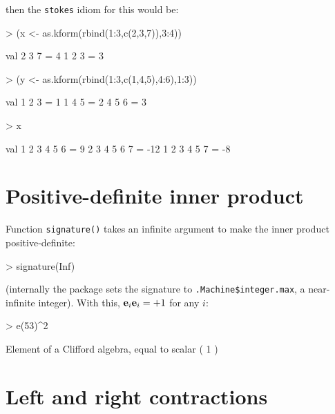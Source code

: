\documentclass{article}
\begin{document}
then the {\tt stokes} idiom for this would be:

\begin{Schunk}
\begin{Sinput}
> (x <- as.kform(rbind(1:3,c(2,3,7)),3:4))
\end{Sinput}
\begin{Soutput}
           val
 2 3 7  =    4
 1 2 3  =    3
\end{Soutput}
\begin{Sinput}
> (y <- as.kform(rbind(1:3,c(1,4,5),4:6),1:3))
\end{Sinput}
\begin{Soutput}
           val
 1 2 3  =    1
 1 4 5  =    2
 4 5 6  =    3
\end{Soutput}
\begin{Sinput}
> x %
\end{Sinput}
\begin{Soutput}
                 val
 1 2 3 4 5 6  =    9
 2 3 4 5 6 7  =  -12
 1 2 3 4 5 7  =   -8
\end{Soutput}
\end{Schunk}


\section{Positive-definite inner product}

Function {\tt signature()} takes an infinite argument to make the
inner product positive-definite:

\begin{Schunk}
\begin{Sinput}
> signature(Inf)
\end{Sinput}
\end{Schunk}

(internally the package sets the signature to
{\tt .Machine\$integer.max}, a near-infinite integer).  With this,
${\bf e}_{i}{\bf e}_{i}=+1$ for any $i$:

\begin{Schunk}
\begin{Sinput}
> e(53)^2
\end{Sinput}
\begin{Soutput}
Element of a Clifford algebra, equal to
scalar ( 1 )
\end{Soutput}
\end{Schunk}


\section{Left and right contractions}
\end{document}
